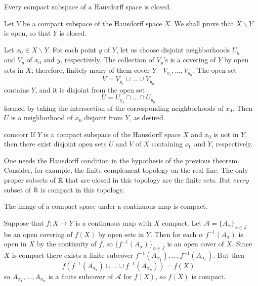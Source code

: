 \documentclass[12pt, a4paper, twoside, openright, titlepage]{book}
\begin{document}
\begin{thm}{}{}
    Every compact subspace of a Hausdorff space is closed.
\end{thm}
\begin{proof*}{}{}
    Let $Y$ be a compact subspace of the Hausdorff space $X$. We shall prove that $X\backslash Y$ is open, so that $Y$ is closed.

    Let $x_0 \in X\backslash Y$. For each point $y$ of $Y$, let us choose disjoint neighborhoods $U_y$ and $V_y$ of $x_0$ and $y$, respectively. The collection of $V_y$'s is a covering of $Y$ by open sets in $X$; therefore, finitely many of them cover $Y$ - $V_{y_1},...,V_{y_n}$. The open set \begin{equation*}
        V = V_{y_1}\cup...\cup V_{y_n}
    \end{equation*}
    contains $Y$, and it is disjoint from the open set \begin{equation*}
        U = U_{y_1}\cap ...\cap U_{y_n}
    \end{equation*}
    formed by taking the intersection of the corresponding neighborhoods of $x_0$. Then $U$ is a neighborhood of $x_0$ disjoint from $Y$, as desired.
\end{proof*}

\begin{cor}{}{comcorr}
    If $Y$ is a compact subspace of the Hausdorff space $X$ and $x_0$ is not in $Y$, then there exist disjoint open sets $U$ and $V$ of $X$ containing $x_0$ and $Y$, respectively.
\end{cor}

\begin{eg}{}{}
    One needs the Hausdorff condition in the hypothesis of the previous theorem. Consider, for example, the finite complement topology on the real line. The only proper subsets of $\mathbb R$ that are closed in this topology are the finite sets. But \emph{every} subset of $\mathbb R$ is compact in this topology.
\end{eg}

\begin{thm}{}{}
    The image of a compact space under a continuous map is compact.
\end{thm}
\begin{proof*}{}{}
    Suppose that $f:X\rightarrow Y$ is a continuous map with $X$ compact. Let $\mathcal{A} = \{A_{\alpha}\}_{\alpha \in J}$ be an open covering of $f(X)$ by open sets in $Y$. Then for each $\alpha$ $f^{-1}(A_{\alpha})$ is open in $X$ by the continuity of $f$, so $\{f^{-1}(A_{\alpha})\}_{\alpha \in J}$ is an open cover of $X$. Since $X$ is compact there exists a finite subcover $f^{-1}(A_{\alpha_1}),...,f^{-1}(A_{\alpha_n})$. But then $$f(f^{-1}(A_{\alpha_1})\cup...\cup f^{-1}(A_{\alpha_n})) = f(X)$$ so $A_{\alpha_1},...,A_{\alpha_n}$ is a finite subcover of $\mathcal{A}$ for $f(X)$, so $f(X)$ is compact.
\end{proof*}
\end{document}
